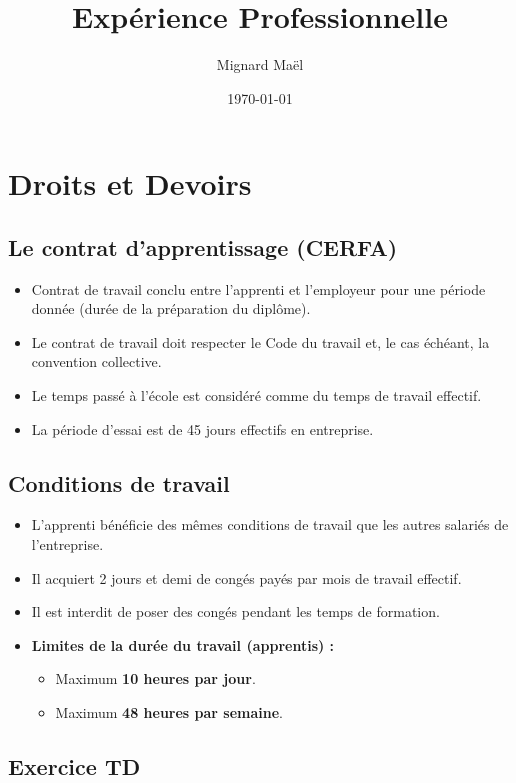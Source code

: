 \documentclass[a4paper,12pt]{article}
\title{Expérience Professionnelle}
\author{Mignard Maël}
\date{\today}
\begin{document}
\maketitle
\section{Droits et Devoirs}

\vspace{1cm}
\subsection*{Le contrat d'apprentissage (CERFA)}
\begin{itemize}
    \item Contrat de travail conclu entre l'apprenti et l'employeur pour une période donnée (durée de la préparation du diplôme).
    \item Le contrat de travail doit respecter le Code du travail et, le cas échéant, la convention collective.
    \item Le temps passé à l'école est considéré comme du temps de travail effectif.
    \item La période d'essai est de 45 jours effectifs en entreprise.
\end{itemize}
\subsection*{Conditions de travail}
\begin{itemize}
    \item L'apprenti bénéficie des mêmes conditions de travail que les autres salariés de l'entreprise.
    \item Il acquiert 2 jours et demi de congés payés par mois de travail effectif.
    \item Il est interdit de poser des congés pendant les temps de formation.
    \item \textbf{Limites de la durée du travail (apprentis) :}
    \begin{itemize}
        \setlength\itemsep{0.3em}
        \item Maximum \textbf{10 heures par jour}.
        \item Maximum \textbf{48 heures par semaine}.
    \end{itemize}
\end{itemize}
\clearpage
\subsection{Exercice TD}
\vspace{1cm}
\end{document}
